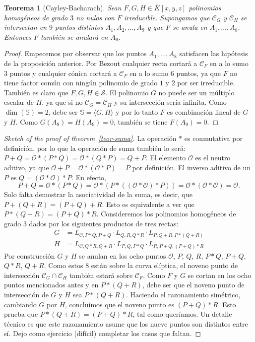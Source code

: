 \documentclass[a4paper, 11pt]{article}
\newcounter{numerodetema}
\theoremstyle{plain}
\newtheorem{teor}{Teorema}[numerodetema]
\theoremstyle{definition}
\begin{document}
\begin{teor}[Cayley-Bacharach]
Sean $F,G,H\in\overline{K}[x,y,z]$ polinomios homogéneos de grado $3$ no nulos con $F$
irreducible. Supongamos que $\mathcal{C}_G$ y $\mathcal{C}_H$ se intersectan en $9$
puntos \emph{distintos} $A_1,A_2,\ldots,A_9$ y que $F$ se anula en $A_1,\ldots,A_8$.
Entonces $F$ también se anulará en $A_9$.
\end{teor}
\begin{proof}
Empecemos por observar que los puntos $A_1,\ldots,A_8$ satisfacen las hipótesis de la
proposición anterior. Por Bezout cualquier recta cortará a $\mathcal{C}_F$ en a lo
sumo $3$ puntos y cualquier cónica cortará a $\mathcal{C}_F$ en a lo sumo $6$ puntos,
ya que $F$ no tiene factor común con ningún polinomio de grado $1$ y $2$ por ser
irreducible. También es claro que $F,G,H\in\mathcal{S}$. El polinomio $G$
no puede ser un múltiplo escalar de $H$, ya que si no $\mathcal{C}_G=\mathcal{C}_H$ y
su intersección sería infinita. Como $\dim(\mathbb{S})=2$, debe ser $\mathbb{S}=\langle
G,H\rangle$ y por lo tanto $F$ es combinación lineal de $G$ y $H$. Como $G(A_9)=H(A_9)=0$,
también se tiene $F(A_9)=0$.
\end{proof}

\begin{proof}[Sketch of the proof of theorem~\ref{teor-suma}]
La operación $*$ es conmutativa por definición, por lo que la operación de suma también
lo será: $P+Q=\mathcal{O}*(P*Q)=\mathcal{O}*(Q*P)=Q+P$. El elemento $\mathcal{O}$ es el
neutro aditivo, ya que $\mathcal{O}+P=\mathcal{O}*(\mathcal{O}*P)=P$ por definición.
El inverso aditivo de un $P$ es $Q=(\mathcal{O}*\mathcal{O})*P$. En efecto,
\[
   P+Q=\mathcal{O}*(P*Q)=\mathcal{O}*(P*((\mathcal{O}*\mathcal{O})*P))=
   \mathcal{O}*(\mathcal{O}*\mathcal{O})=\mathcal{O}.
\]
Solo falta demostrar la asociatividad de la suma, es decir, que $P+(Q+R)=(P+Q)+R$.
Esto es equivalente a ver que $P*(Q+R)=(P+Q)*R$. Consideremos los polinomios homogéneos
de grado $3$ dados por los siguientes productos de tres rectas:
\[
\begin{aligned}
G & = L_{\mathcal{O},P*Q,P+Q}\cdot L_{Q,R,Q*R}\cdot L_{P,Q+R,P*(Q+R)} \\
H & = L_{\mathcal{O},Q*R,Q+R}\cdot L_{P,Q,P*Q}\cdot L_{R,P+Q,(P+Q)*R}
\end{aligned}
\]
Por construcción $G$ y $H$ se anulan en los ocho puntos $\mathcal{O}$, $P$, $Q$, $R$,
$P*Q$, $P+Q$, $Q*R$, $Q+R$. Como estos $8$ están sobre la curva elíptica, el noveno
punto de intersección $\mathcal{C}_G\cap\mathcal{C}_H$ también estará sobre $\mathcal{C}_F$.
Como $F$ y $G$ se cortan en los ocho puntos mencionados antes y en $P*(Q+R)$, debe ser
que el noveno punto de intersección de $G$ y $H$ sea $P*(Q+R)$. Haciendo el razonamiento
simétrico, cambiando $G$ por $H$, concluímos que el noveno punto es $(P+Q)*R$. Esto
prueba que $P*(Q+R)=(P+Q)*R$, tal como queríamos. Un detalle técnico es que este 
razonamiento asume que los nueve puntos son distintos entre sí. Dejo como ejercicio
(difícil) completar los casos que faltan.
\end{proof}
\end{document}
